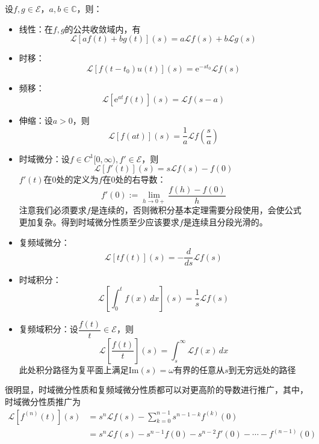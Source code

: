 \begin{proposition}[拉普拉斯变换的性质]
    设$f,g\in\mathcal{E} $，$a,b\in\mathbb{C}$，则：\begin{itemize}
        \item 线性：在$f,g$的公共收敛域内，有\[\mathcal{L} [af(t)+bg(t)](s)=a\mathcal{L} f(s)+b\mathcal{L} g(s)\]
        \item 时移：\[\mathcal{L} [f(t-t_0)u(t)](s)=\mathrm{e}^{-s t_0}\mathcal{L} f(s)\]
        \item 频移：\[\mathcal{L} [\mathrm{e}^{a t}f(t)](s)=\mathcal{L} f(s-a)\]
        \item 伸缩：设$a>0$，则\[\mathcal{L} [f(at)](s)=\frac{1}{a}\mathcal{L} f\left(\frac{s}{a}\right)\]
        \item 时域微分：设$f\in C^1[0,\infty),f'\in\mathcal{E} $，则\[\mathcal{L} [f'(t)](s)=s\mathcal{L} f(s)-f(0)\]
        $f'(t)$在0处的定义为$f$在0处的右导数：$$f'(0):=\lim_{h\to 0+}\dfrac{f(h)-f(0)}{h}$$
        注意我们必须要求$f$是连续的，否则微积分基本定理需要分段使用，会使公式更加复杂。得到时域微分性质至少应该要求$f$是连续且分段光滑的。
        \item 复频域微分：\[\mathcal{L} [t f(t)](s)=-\frac{d}{ds}\mathcal{L} f(s)\]
        \item 时域积分：\[\mathcal{L} \left[\int_0^t f(x)\,dx\right](s)=\frac{1}{s}\mathcal{L} f(s)\]
        \item 复频域积分：设$\dfrac{f(t)}{t}\in\mathcal{E} $，则\[\mathcal{L} \left[\frac{f(t)}{t}\right](s)=\int_s^{\infty}\mathcal{L}f(x)\,dx\]
        此处积分路径为复平面上满足$\mathrm{Im}(s)=\omega$有界的任意从$s$到无穷远处的路径
    \end{itemize}
\end{proposition}
\begin{remark}
    很明显，时域微分性质和复频域微分性质都可以对更高阶的导数进行推广，其中，时域微分性质推广为\begin{align*}
\mathcal{L} [f^{(n)}(t)](s)&=s^n\mathcal{L} f(s)-\sum_{k=0}^{n-1}s^{n-1-k}f^{(k)}(0)\\
&=s^n\mathcal{L} f(s)-s^{n-1}f(0)-s^{n-2}f'(0)-\cdots -f^{(n-1)}(0)
\end{align*}
\end{remark}
